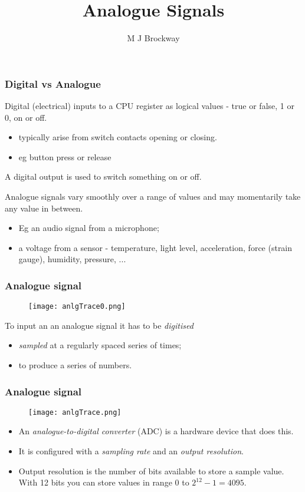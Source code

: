 \documentclass[10pt]{beamer}
\title{Analogue Signals}
\author{M J Brockway}
\begin{document}
\maketitle

\begin{frame}
\frametitle{Digital vs Analogue}
Digital (electrical) inputs to a CPU register as logical values - true or false, 1 or 0, {\color{red}on} or {\color{blue}off}.
\begin{itemize}
\item typically arise from switch contacts opening or closing. 
\item eg button press or release
\end{itemize}

A digital output is used to switch something on or off.

Analogue signals vary smoothly over a range of values and may momentarily take any value in between.
\begin{itemize}
\item Eg an audio signal from a microphone; 
\item a voltage from a sensor - temperature, light level, acceleration, force (strain gauge), humidity, pressure, ...
\end{itemize}
\end{frame}

\begin{frame}
\frametitle{Analogue signal}
\begin{figure}[!htb]
\begin{center}
\texttt{[image: anlgTrace0.png]}
\end{center}
\end{figure}

To input an an analogue signal it has to be \emph{digitised} 
\begin{itemize}
\item \emph{sampled} at a regularly spaced series of times;
\item to produce a series of numbers.
\end{itemize}
\end{frame}

\begin{frame}
\frametitle{Analogue signal}
\begin{figure}[!htb]
\begin{center}
\texttt{[image: anlgTrace.png]}
\end{center}
\end{figure}

\begin{itemize}
\item An \emph{analogue-to-digital converter} (ADC) is a hardware device that does this.
\item It is configured with a \emph{sampling rate} and an \emph{output resolution}.
\item Output resolution is the number of bits available to store a sample value. With 12 bits you can store values in range 0 to $2^{12} - 1 = 4095$.
\end{itemize}
\end{frame}
\end{document}

